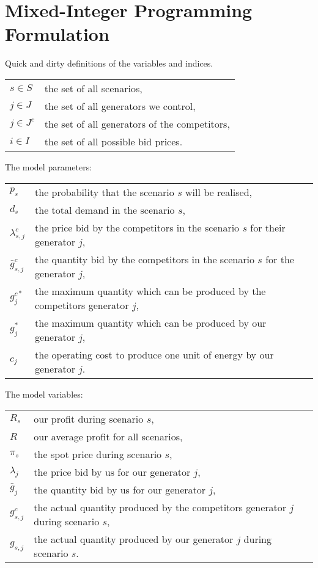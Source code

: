\documentclass[12pt]{article}
\begin{document}
\section{Mixed-Integer Programming Formulation}

Quick and dirty definitions of the variables and indices.

\begin{tabular}{ll}
$s \in S$ & the set of all scenarios, \\
$j \in J$ & the set of all generators we control, \\
$j \in J^c$ & the set of all generators of the competitors, \\
$i \in I$ & the set of all possible bid prices.
\end{tabular}

The model parameters:

\begin{tabular}{ll}
$p_s$ & the probability that the scenario $s$ will be realised, \\
$d_s$ & the total demand in the scenario $s$, \\
$\lambda^c_{s,j}$ & the price bid by the competitors in the scenario $s$ for their generator $j$, \\
$\bar{g}^c_{s,j}$ & the quantity bid by the competitors in the scenario $s$ for the generator $j$, \\
$g^{c*}_j$ & the maximum quantity which can be produced by the competitors generator $j$, \\
$g^*_j$ & the maximum quantity which can be produced by our generator $j$, \\
$c_j$ & the operating cost to produce one unit of energy by our generator $j$.
\end{tabular}

The model variables:

\begin{tabular}{ll}
$R_s$ & our profit during scenario $s$, \\
$R$ & our average profit for all scenarios, \\
$\pi_s$ & the spot price during scenario $s$, \\
$\lambda_{j}$ & the price bid by us for our generator $j$, \\
$\bar{g}_{j}$ & the quantity bid by us for our generator $j$, \\
$g^c_{s,j}$ & the actual quantity produced by the competitors generator $j$ during scenario $s$, \\
$g_{s,j}$ & the actual quantity produced by our generator $j$ during scenario $s$.
\end{tabular}
\end{document}
